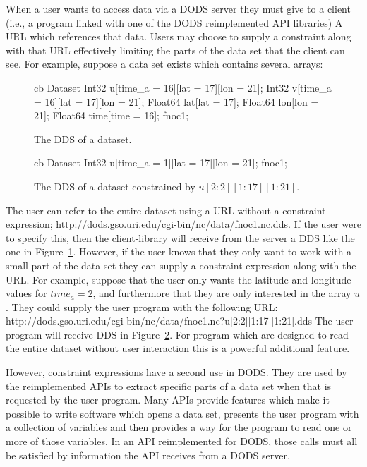 When a user wants to access data via a DODS server they must give to a client
(i.e., a program linked with one of the DODS reimplemented API libraries) A
URL which references that data. Users may choose to supply a constraint along
with that URL effectively limiting the parts of the data set that the client
can see. For example, suppose a data set exists which contains several
arrays:

\begin{figure}
\begin{code}{cb}
    Dataset {
        Int32 u[time_a = 16][lat = 17][lon = 21];
        Int32 v[time_a = 16][lat = 17][lon = 21];
        Float64 lat[lat = 17];
        Float64 lon[lon = 21];
        Float64 time[time = 16];
    } fnoc1;
\end{code}
\caption{The DDS of a dataset.}
\label{url:fig:dds}
\end{figure}

\begin{figure}
\begin{code}{cb}
    Dataset {
        Int32 u[time_a = 1][lat = 17][lon = 21];
    } fnoc1;
\end{code}
\caption{The DDS of a dataset constrained by $u[2:2][1:17][1:21]$.}
\label{url:fig:dds2}
\end{figure}

The user can refer to the entire dataset using a URL without a constraint
expression;
{http://dods.gso.uri.edu/cgi-bin/nc/data/fnoc1.nc.dds}. If the user were to
specify this, then the client-library will receive from the server a DDS like
the one in Figure~\ref{url:fig:dds}. However, if the user knows that they
only want to work with a small part of the data set they can supply a
constraint expression along with the URL\@. For example, suppose that the
user only wants the latitude and longitude values for $time_a = 2$, and
furthermore that they are only interested in the array $u$. They could supply
the user program with the following URL:
{http://dods.gso.uri.edu/cgi-bin/nc/data/fnoc1.nc?u[2:2][1:17][1:21].dds} The
user program will receive DDS in Figure~\ref{url:fig:dds2}. For program which
are designed to read the entire dataset without user interaction this is a
powerful additional feature.

However, constraint expressions have a second use in DODS\@. They are used by
the reimplemented APIs to extract specific parts of a data set when that is
requested by the user program. Many APIs provide features which make it
possible to write software which opens a data set, presents the user program
with a collection of variables and then provides a way for the program to
read one or more of those variables. In an API reimplemented for DODS, those
calls must all be satisfied by information the API receives from a DODS
server.

